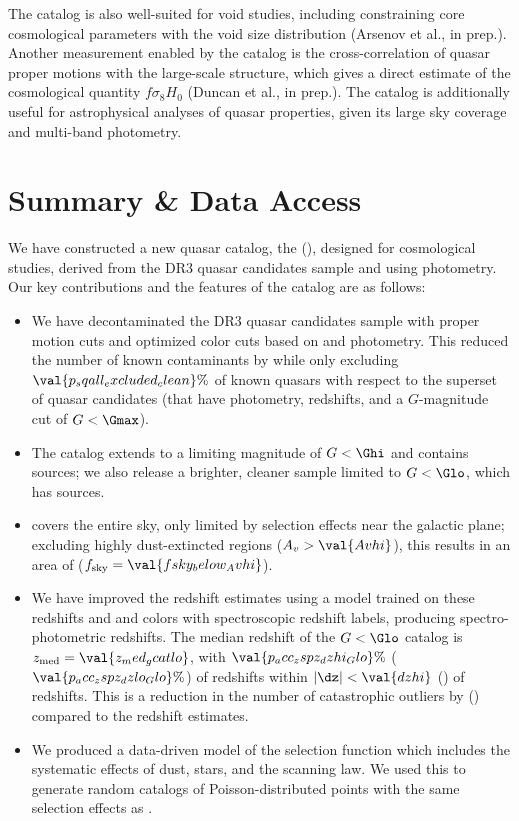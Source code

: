 The catalog is also well-suited for void studies, including constraining core cosmological parameters with the void size distribution (Arsenov et al., in prep.).
Another measurement enabled by the catalog is the cross-correlation of quasar proper motions with the large-scale structure, which gives a direct estimate of the cosmological quantity $f \sigma_8 H_0$ (Duncan et al., in prep.).
The catalog is additionally useful for astrophysical analyses of quasar properties, given its large sky coverage and multi-band photometry.


\section{Summary \& Data Access}
\label{sec:summary}

We have constructed a new quasar catalog, the \catalog (\cat), designed for cosmological studies, derived from the \Gaia DR3 quasar candidates sample and using \unWISE photometry.
Our key contributions and the features of the catalog are as follows:
\begin{itemize}
\setlength\itemsep{0.5ex}
    \item We have decontaminated the \Gaia DR3 quasar candidates sample with proper motion cuts and optimized color cuts based on \Gaia and \unWISE photometry. This reduced the number of known contaminants by  while only excluding $\val{p_sqall_excluded_clean}\%$ of known quasars with respect to the superset of \Gaia quasar candidates (that have \unWISE photometry, \Gaia redshifts, and a $G$-magnitude cut of $G<\Gmax$).  
    \item The catalog extends to a limiting magnitude of $G<\Ghi$ and contains  sources; we also release a brighter, cleaner sample limited to $G<\Glo$, which has  sources.
    \item \cat covers the entire sky, only limited by selection effects near the galactic plane; excluding highly dust-extincted regions ($A_v > \val{Avhi}$), this results in an area of  ($f_\mathrm{sky}=\val{fsky_below_Avhi}$).
    \item We have improved the \Gaia redshift estimates using a \knn model trained on these redshifts and \Gaia and \unWISE colors with \SDSS spectroscopic redshift labels, producing spectro-photometric redshifts. The median redshift of the $G<{\Glo}$ catalog is $z_\mathrm{med}=\val{z_med_gcatlo}$, with $\val{p_acc_zspz_dzhi_Glo}\%$ ($\val{p_acc_zspz_dzlo_Glo}\%$) of redshifts within $|\dz|<\val{dzhi}$ () of \SDSS redshifts. This is a reduction in the number of catastrophic outliers by  () compared to the \Gaia redshift estimates.
    \item We produced a data-driven model of the selection function which includes the systematic effects of dust, stars, and the \Gaia scanning law. We used this to generate random catalogs of Poisson-distributed points with the same selection effects as \cat.
\end{itemize}

